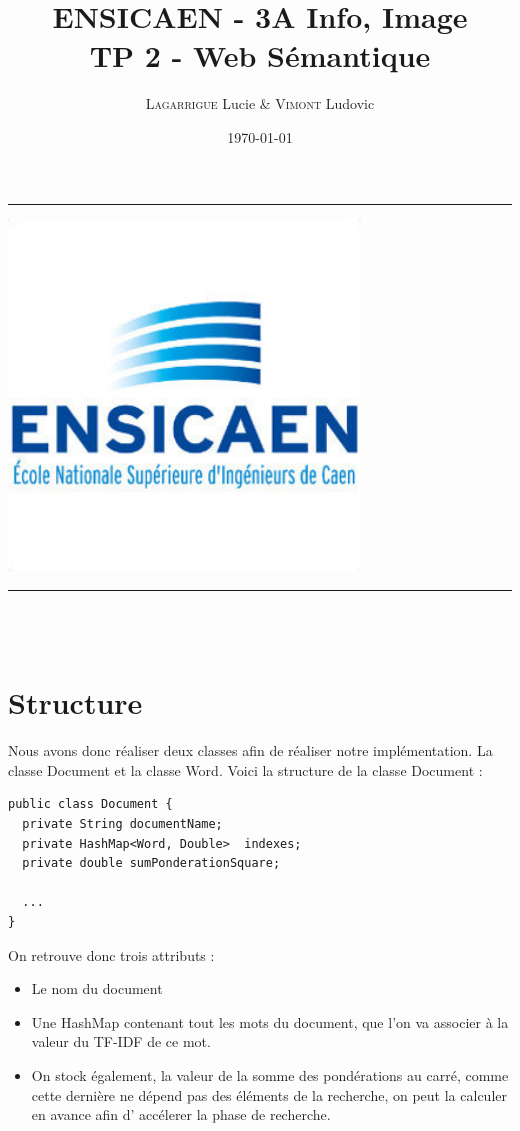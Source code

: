 \documentclass{article}
\title{ENSICAEN - 3A Info, Image\\TP 2 - Web Sémantique}
\author{\textsc{Lagarrigue} Lucie \& \textsc{Vimont} Ludovic}
\date{\today}
\newcommand{\HRule}{\rule{\linewidth}{0.5mm}}
\begin{document}
\begin{titlepage}
	\begin{center}
		\vspace*{\fill}
		\textsc{\Large \@title }
		\HRule
		\vspace{0.5cm}
		\begin{center}
			\includegraphics[width=0.7\textwidth]{../data/logo.jpg}
		\end{center}
		\vspace{0.5cm}
		\HRule \\
		\large{\@author} \\
		\@date
		\vspace*{\fill}
	\end{center}
\end{titlepage}


\section{Structure}

Nous avons donc réaliser deux classes afin de réaliser notre implémentation. La classe
Document et la classe Word. Voici la structure de la classe Document :

\begin{lstlisting}
public class Document {
  private String documentName;
  private HashMap<Word, Double>  indexes;
  private double sumPonderationSquare;

  ...
}
\end{lstlisting}

On retrouve donc trois attributs :
\begin{itemize}
  \item Le nom du document
  \item Une HashMap contenant tout les mots du document, que l'on va associer à la valeur du
  TF-IDF de ce mot.
  \item On stock également, la valeur de la somme des pondérations au carré, comme cette
  dernière ne dépend pas des éléments de la recherche, on peut la calculer en avance afin d'
  accélerer la phase de recherche.
\end{itemize}
\end{document}
